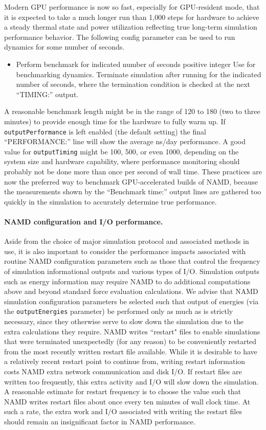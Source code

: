 Modern GPU performance is now so fast,
especially for GPU-resident mode,
that it is expected to take a much longer run than 1,000 steps
for hardware to achieve a steady thermal state and power utilization
reflecting true long-term simulation performance behavior.
The following config parameter can be used to run
dynamics for some number of seconds.
\begin{itemize}
\item
{}
{Perform benchmark for indicated number of seconds}
{positive integer}{%
Use for benchmarking dynamics. Terminate simulation after running for
the indicated number of seconds, where the termination condition is
checked at the next ``TIMING:'' output.
}
\end{itemize}
A reasonable benchmark length might be in the range of 120 to 180
(two to three minutes) to provide enough time
for the hardware to fully warm up.
If \texttt{outputPerformance} is left enabled (the default setting)
the final ``PERFORMANCE:'' line will show
the average ns/day performance.
A good value for \texttt{outputTiming} might be 100, 500,
or even 1000, depending on the system size and hardware capability,
where performance monitoring should probably not be done more than
once per second of wall time.
These practices are now the preferred way to benchmark GPU-accelerated
builds of NAMD, because the measurements shown by the
``Benchmark time:'' output lines are gathered too quickly
in the simulation to accurately determine true performance.


\paragraph{NAMD configuration and I/O performance.}
Aside from the choice of major simulation protocol and associated
methods in use, it is also important to consider the performance impacts
associated with routine NAMD configuration parameters such as those
that control the frequency of simulation informational outputs and 
various types of I/O.
Simulation outputs such as energy information may require NAMD to do additional
computations above and beyond standard force evaluation calculations.
We advise that NAMD simulation configuration parameters be selected such
that output of energies (via the \texttt{outputEnergies} parameter) 
be performed only as much as is strictly necessary, since 
they otherwise serve to slow down the simulation due to the extra
calculations they require.  
NAMD writes ``restart" files to enable simulations that were terminated 
unexpectedly (for any reason) to be conveniently restarted from the 
most recently written restart file available.  While it is desirable
to have a relatively recent restart point to continue from, writing
restart information costs NAMD extra network communication and disk I/O.
If restart files are written too frequently, this extra activity and I/O
will slow down the simulation.  A reasonable estimate for restart
frequency is to choose the value such that NAMD writes restart files
about once every ten minutes of wall clock time.  
At such a rate, the extra work and I/O associated with writing
the restart files should remain an insignificant factor in NAMD performance.

